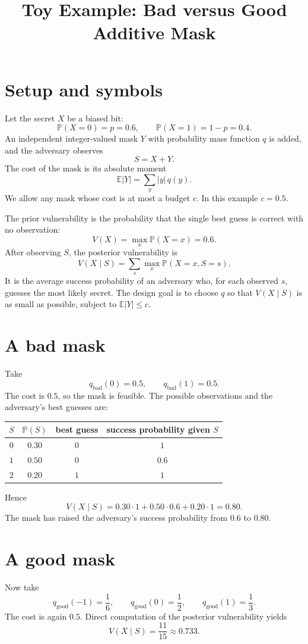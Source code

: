 \documentclass{article}
\title{Toy Example: Bad versus Good Additive Mask}
\author{}
\date{}
\begin{document}
\maketitle

\section{Setup and symbols}
Let the secret \(X\) be a biased bit:
\[
\mathbb{P}(X=0)=p=0.6,\qquad\mathbb{P}(X=1)=1-p=0.4.
\]
An independent integer-valued mask \(Y\) with probability mass function \(q\) is added, and the adversary observes
\[
S=X+Y.
\]
The cost of the mask is its absolute moment
\[
\mathbb{E}|Y|=\sum_y|y|\,q(y).
\]
We allow any mask whose cost is at most a budget \(c\). In this example \(c=0.5\).

The prior vulnerability is the probability that the single best guess is correct with no observation:
\[
V(X)=\max_x\mathbb{P}(X=x)=0.6.
\]
After observing \(S\), the posterior vulnerability is
\[
V(X\mid S)=\sum_s\max_x\mathbb{P}(X=x,S=s).
\]
It is the average success probability of an adversary who, for each observed \(s\), guesses the most likely secret. The design goal is to choose \(q\) so that \(V(X\mid S)\) is as small as possible, subject to \(\mathbb{E}|Y|\le c\).

\section{A bad mask}
Take
\[
q_{\mathrm{bad}}(0)=0.5,\qquad q_{\mathrm{bad}}(1)=0.5.
\]
The cost is \(0.5\), so the mask is feasible. The possible observations and the adversary's best guesses are:

\begin{center}
\begin{tabular}{c|c|c|c}
\(S\) & \(\mathbb{P}(S)\) & best guess & success probability given \(S\)\\
\hline
\(0\) & \(0.30\) & \(0\) & \(1\)\\
\(1\) & \(0.50\) & \(0\) & \(0.6\)\\
\(2\) & \(0.20\) & \(1\) & \(1\)
\end{tabular}
\end{center}
Hence
\[
V(X\mid S)=0.30\cdot1+0.50\cdot0.6+0.20\cdot1=0.80.
\]
The mask has raised the adversary's success probability from \(0.6\) to \(0.80\).

\section{A good mask}
Now take
\[
q_{\mathrm{good}}(-1)=\frac16,\qquad
q_{\mathrm{good}}(0)=\frac12,\qquad
q_{\mathrm{good}}(1)=\frac13.
\]
The cost is again \(0.5\). Direct computation of the posterior vulnerability yields
\[
V(X\mid S)=\frac{11}{15}\approx0.733.
\]
\end{document}
